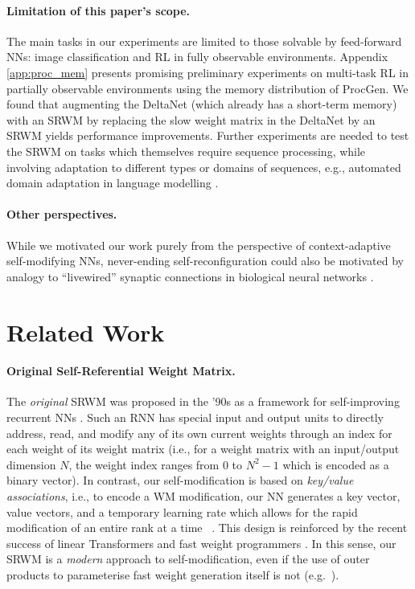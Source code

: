 \documentclass[nohyperref]{article}
\theoremstyle{plain}
\theoremstyle{definition}
\theoremstyle{remark}
\begin{document}
\paragraph{Limitation of this paper's scope.}
The main tasks in our experiments are limited to those solvable by feed-forward NNs: image classification and RL in fully observable environments.
Appendix
\ref{app:proc_mem} presents promising preliminary experiments on multi-task RL in partially observable environments using the memory distribution of ProcGen.
We found that augmenting the DeltaNet (which already has a short-term memory) with an SRWM by replacing the slow weight matrix in the DeltaNet by an SRWM yields performance improvements.
Further experiments are needed to test the SRWM on tasks which themselves require sequence processing, while
involving adaptation to different types or domains of sequences, e.g., automated domain adaptation in language modelling \citep{irie18:radmm, lazaridou2021pitfalls}.

\paragraph{Other perspectives.}
While we motivated our work purely from the perspective of context-adaptive self-modifying NNs, never-ending self-reconfiguration could also be motivated by analogy to ``livewired'' synaptic connections in biological neural networks \citep{eagleman2020livewired}.

\section{Related Work}
\label{sec:rel}
\paragraph{Original Self-Referential Weight Matrix.}
The \textit{original} SRWM
was proposed in the '90s
as a framework for self-improving recurrent NNs \citep{Schmidhuber:92selfref, Schmidhuber:93selfrefann, Schmidhuber:93selfreficann, Schmidhuber:93selfrefieee}.
Such an RNN has special input and output units to directly address, read, and modify any of its own current weights through an index for each weight of its weight matrix (i.e., 
for a weight matrix with an input/output dimension $N$, the weight index ranges from 0 to $N^2-1$ which is encoded as a binary vector).
In contrast, our self-modification is based on \textit{key/value associations}, i.e., to encode a WM modification, our NN generates a key vector, value vectors, and a temporary learning rate which allows for the rapid modification of an entire rank at a time ~\citep{Schmidhuber:91fastweights,schmidhuber1993reducing}. 
This design is reinforced by the recent success of
linear Transformers and fast weight programmers \citep{katharopoulos2020transformers, schlag2021linear, irie2021going}.
In this sense, our SRWM is a \textit{modern} approach to self-modification,
even if the use of outer products to parameterise fast weight generation itself is not (e.g.~\citet{Schmidhuber:91fastweights, schmidhuber1993reducing}).
\end{document}
